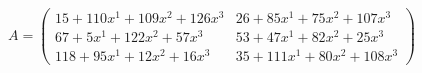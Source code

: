 \documentclass[preview]{standalone}
\begin{document}
\begin{align*}
A = \begin{pmatrix}15 + 110x^{1} + 109x^{2} + 126x^{3} & 26 + 85x^{1} + 75x^{2} + 107x^{3} \\ 67 + 5x^{1} + 122x^{2} + 57x^{3} & 53 + 47x^{1} + 82x^{2} + 25x^{3} \\ 118 + 95x^{1} + 12x^{2} + 16x^{3} & 35 + 111x^{1} + 80x^{2} + 108x^{3}\end{pmatrix}
\end{align*}
\end{document}
